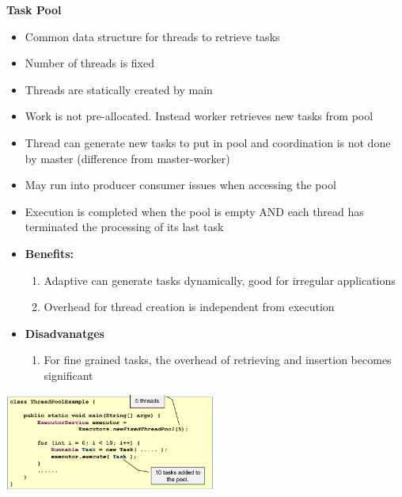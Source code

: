 \documentclass[10pt, landscape]{article}
\begin{document}
\begin{multicols}{4}
\textbf{Task Pool}
\begin{itemize}
    \item Common data structure for threads to retrieve tasks 
    \item Number of threads is fixed 
    \item Threads are statically created by main 
    \item Work is not pre-allocated. Instead  worker retrieves new tasks from pool 
    \item Thread can generate new tasks to put in pool and coordination is not done by master (difference from master-worker)
    \item May run into producer consumer issues when accessing the pool 
    \item Execution is completed when the pool is empty AND each thread has terminated the processing of its last task 
    \item \textbf{Benefits:} 
    \begin{enumerate}
        \item Adaptive can generate tasks dynamically, good for irregular applications
        \item Overhead for thread creation is independent from execution 
    \end{enumerate}
    \item \textbf{Disadvanatges}
    \begin{enumerate}
        \item For fine grained tasks, the overhead of retrieving and insertion becomes significant
    \end{enumerate}
\end{itemize}
\includegraphics*[width=7cm]{java_pool}


\end{multicols}
\end{document}

